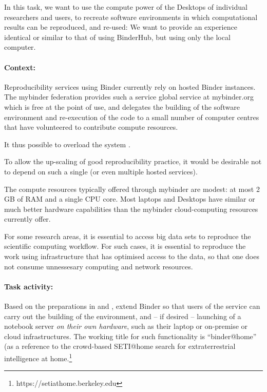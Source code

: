 \begin{task}[
  title=Binder@Home,
  id=binder-at-home,
  lead=SRL,
  PM=7,
  wphases={0-36},
  partners={MP,UIO}
]
In this task, we want to use the compute power of the Desktops of individual researchers and
users, to recreate software environments in which computational results can be
reproduced, and re-used: We want to provide an experience identical or similar
to that of using BinderHub, but using only the local computer.

\paragraph*{Context:} Reproducibility services using Binder currently rely on hosted Binder instances.
The mybinder federation provides such a service global service at mybinder.org
which is free at
the point of use, and delegates the building of the software environment and
re-execution of the code to a small number of computer centres that have
volunteered to contribute compute resources.

It thus possible to overload the system .

To allow the up-scaling of good reproducibility practice, it would be
desirable not to depend on such a single (or even multiple hosted services).

The compute resources typically offered through mybinder are modest: at most 2 GB of RAM
and a single CPU core.
Most laptops and Desktops have similar or much better hardware capabilities than
the mybinder cloud-computing resources currently offer.

For some research areas, it is essential to access big data sets to reproduce the scientific computing workflow.  For such cases, it is essential to reproduce the work using infrastructure that has optimised access to the data, so that one does not consume unnessesary computing and network resources.  

\paragraph*{Task activity:} Based on the preparations in  and
, extend Binder so that users of the service can
carry out the building of the environment, and -- if desired -- launching of a
notebook server \emph{on their own hardware}, such as their laptop or on-premise or cloud infrastructures.   The working title for such
functionality is ``binder@home'' (as a reference to the crowd-based SETI@home search for
extraterrestrial intelligence at home.\footnote{https://setiathome.berkeley.edu}


\end{task}
